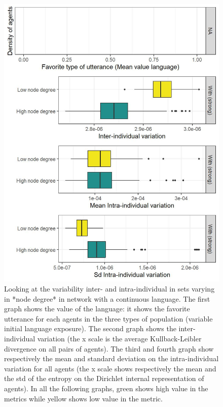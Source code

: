 \documentclass[
]{article}
\begin{document}
\begin{figure}[!H]

{\centering \includegraphics{./Figures/unnamed-chunk-62-1} 

}

\caption{Looking at the variability inter- and intra-individual in sets varying in *node degree* in network with a continuous language. The first graph shows the value of the language: it shows the favorite utterance for each agents in the three types of population (variable initial language exposure). The second graph shows the  inter-individual variation (the x scale is the average Kullback-Leibler divergence on all pairs of agents). The third and fourth graph show respectively the mean and standard deviation on the intra-individual variation for all agents (the x scale shows respectively the mean and the std of the entropy on the Dirichlet internal representation of agents). In all the following graphs, green shows high value in the metrics while yellow shows low value in the metric.}\label{fig:unnamed-chunk-62}
\end{figure}
\end{document}
